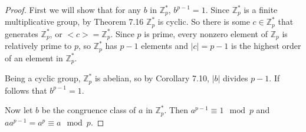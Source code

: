 \documentclass{article}
\begin{document}
\begin{proof} 
    First we will show that for any $b$ in $\mathbb{Z}^*_p$, $b^{p-1} = 1$.  Since $\mathbb{Z}^*_p$ 
    is a finite multiplicative group, by Theorem 7.16 $\mathbb{Z}^*_p$ is cyclic.  So there is some $c \in \mathbb{Z}^*_p$ 
    that generates $\mathbb{Z}^*_p$, or $<c> = \mathbb{Z}^*_p$.  Since $p$ is prime, every nonzero element of $\mathbb{Z}_p$ 
    is relatively prime to $p$, so $\mathbb{Z}^*_p$ has $p-1$ elements and $|c| = p-1$ is the highest order 
    of an element in $\mathbb{Z}^*_p$.

    Being a cyclic group, $\mathbb{Z}^*_p$ is abelian, so by Corollary 7.10, $|b|$ divides $p-1$.  If follows that 
    $b^{p-1} = 1$.

    Now let $b$ be the congruence class of $a$ in $\mathbb{Z}^*_p$.  Then $a^{p-1} \equiv 1 \mod{p}$ and 
    $aa^{p-1} = a^p \equiv a \mod{p}$.
\end{proof}
\end{document}
